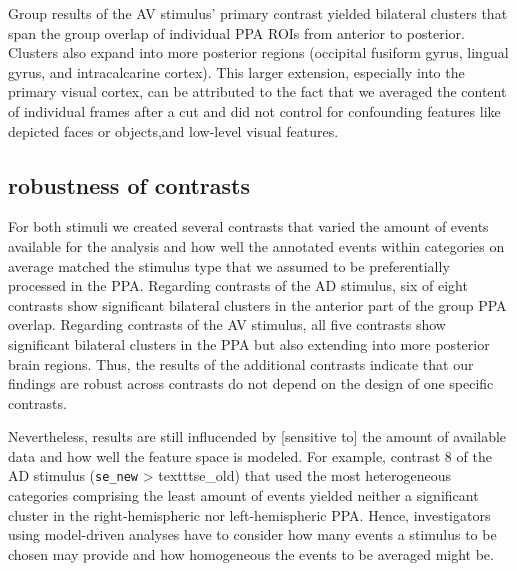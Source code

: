\documentclass[english]{article}
\begin{document}
Group results of the AV stimulus' primary contrast yielded bilateral clusters
that span the group overlap of individual PPA ROIs from anterior to posterior.
Clusters also expand into more posterior regions (occipital fusiform gyrus,
lingual gyrus, and intracalcarine cortex).
This larger extension, especially into the primary visual cortex, can be
attributed to the fact that we averaged the content of individual frames after a
cut and did not control for confounding features like depicted faces or
objects,and low-level visual features.


\subsection{robustness of contrasts}

For both stimuli we created several contrasts that varied the amount of events
available for the analysis and how well the annotated events within categories
on average matched the stimulus type that we assumed to be preferentially
processed in the PPA.
Regarding contrasts of the AD stimulus, six of eight contrasts show significant
bilateral clusters in the anterior part of the group PPA overlap.
Regarding contrasts of the AV stimulus, all five contrasts show significant
bilateral clusters in the PPA but also extending into more posterior brain
regions.
Thus, the results of the additional contrasts indicate that our findings are
robust across contrasts do not depend on the design of one specific
contrasts.

Nevertheless, results are still influcended by [sensitive to] the amount of
available data and how well the feature space is modeled.
For example, contrast 8 of the AD stimulus (\texttt{se\_new} > texttt{se\_old})
that used the most heterogeneous categories comprising the least amount of
events yielded neither a significant cluster in the right-hemispheric nor
left-hemispheric PPA.
Hence, investigators using model-driven analyses have to consider how many
events a stimulus to be chosen may provide and how homogeneous the events to be
averaged might be.
\end{document}
